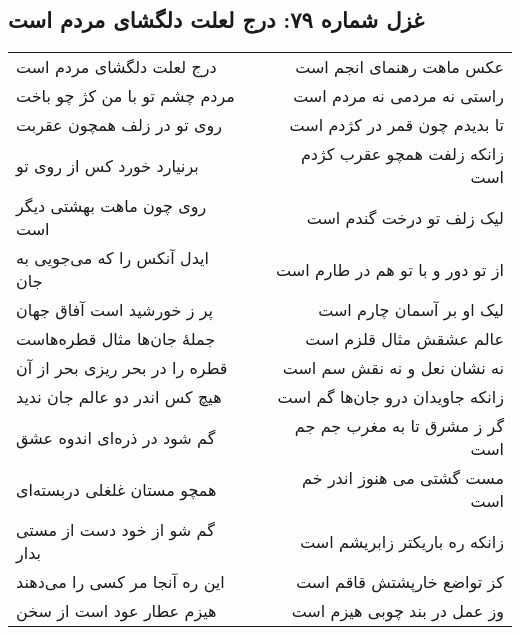 \begin{center}
\section*{غزل شماره ۷۹: درج لعلت دلگشای مردم است}
\label{sec:079}
\begin{longtable}{l p{0.5cm} r}
درج لعلت دلگشای مردم است
&&
عکس ماهت رهنمای انجم است
\\
مردم چشم تو با من کژ چو باخت
&&
راستی نه مردمی نه مردم است
\\
روی تو در زلف همچون عقربت
&&
تا بدیدم چون قمر در کژدم است
\\
برنیارد خورد کس از روی تو
&&
زانکه زلفت همچو عقرب کژدم است
\\
روی چون ماهت بهشتی دیگر است
&&
لیک زلف تو درخت گندم است
\\
ایدل آنکس را که می‌جویی به جان
&&
از تو دور و با تو هم در طارم است
\\
پر ز خورشید است آفاق جهان
&&
لیک او بر آسمان چارم است
\\
جملهٔ جان‌ها مثال قطره‌هاست
&&
عالم عشقش مثال قلزم است
\\
قطره را در بحر ریزی بحر از آن
&&
نه نشان نعل و نه نقش سم است
\\
هیچ کس اندر دو عالم جان ندید
&&
زانکه جاویدان درو جان‌ها گم است
\\
گم شود در ذره‌ای اندوه عشق
&&
گر ز مشرق تا به مغرب جم جم است
\\
همچو مستان غلغلی دربسته‌ای
&&
مست گشتی می هنوز اندر خم است
\\
گم شو از خود دست از مستی بدار
&&
زانکه ره باریکتر زابریشم است
\\
این ره آنجا مر کسی را می‌دهند
&&
کز تواضع خارپشتش قاقم است
\\
هیزم عطار عود است از سخن
&&
وز عمل در بند چوبی هیزم است
\\
\end{longtable}
\end{center}
